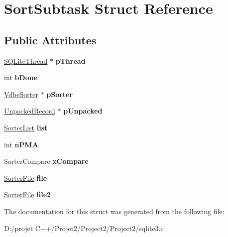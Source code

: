 \hypertarget{struct_sort_subtask}{}\section{Sort\+Subtask Struct Reference}
\label{struct_sort_subtask}
\subsection*{Public Attributes}
\begin{DoxyCompactItemize}
\item 
\mbox{\label{struct_sort_subtask_abb534010ac35e0c37e41c26712e7b58c}} 
\mbox{\hyperlink{struct_s_q_lite_thread}{S\+Q\+Lite\+Thread}} $\ast$ {\bfseries p\+Thread}
\item 
\mbox{\label{struct_sort_subtask_a156fc75053f13e877c36d80885338060}} 
int {\bfseries b\+Done}
\item 
\mbox{\label{struct_sort_subtask_a2a8ec6b4b0d29090e3b33b1a6647655a}} 
\mbox{\hyperlink{struct_vdbe_sorter}{Vdbe\+Sorter}} $\ast$ {\bfseries p\+Sorter}
\item 
\mbox{\label{struct_sort_subtask_af2312bacbb7e4cbe905eae20a60a3f39}} 
\mbox{\hyperlink{struct_unpacked_record}{Unpacked\+Record}} $\ast$ {\bfseries p\+Unpacked}
\item 
\mbox{\label{struct_sort_subtask_a0a79fd21798a08ceede3febbd08c88a2}} 
\mbox{\hyperlink{struct_sorter_list}{Sorter\+List}} {\bfseries list}
\item 
\mbox{\label{struct_sort_subtask_a6ecceaeda562346b298aa9fb95355071}} 
int {\bfseries n\+P\+MA}
\item 
\mbox{\label{struct_sort_subtask_a42bfd224f9e8125c22c2cc66f865d9af}} 
Sorter\+Compare {\bfseries x\+Compare}
\item 
\mbox{\label{struct_sort_subtask_a077f999ff1e4148e48bd8df25092fd85}} 
\mbox{\hyperlink{struct_sorter_file}{Sorter\+File}} {\bfseries file}
\item 
\mbox{\label{struct_sort_subtask_a23b46687f7a96ef1052a062f8097234e}} 
\mbox{\hyperlink{struct_sorter_file}{Sorter\+File}} {\bfseries file2}
\end{DoxyCompactItemize}


The documentation for this struct was generated from the following file\+:\begin{DoxyCompactItemize}
\item 
D\+:/projet C++/\+Projet2/\+Project2/\+Project2/sqlite3.\+c\end{DoxyCompactItemize}
